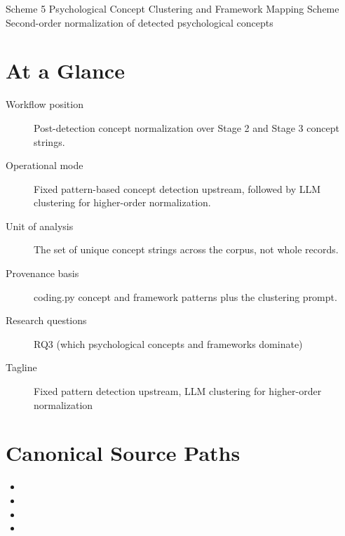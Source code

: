 \documentclass[11pt]{article}
\begin{document}
\schemeheader
  {Scheme 5}
  {Psychological Concept Clustering and Framework Mapping Scheme}
  {Second-order normalization of detected psychological concepts}


\section*{At a Glance}
\begin{description}
\item[Workflow position] Post-detection concept normalization over Stage 2 and Stage 3 concept strings.
\item[Operational mode] Fixed pattern-based concept detection upstream, followed by LLM clustering for higher-order normalization.
\item[Unit of analysis] The set of unique concept strings across the corpus, not whole records.
\item[Provenance basis] coding.py concept and framework patterns plus the clustering prompt.
\item[Research questions] RQ3 (which psychological concepts and frameworks dominate)
\item[Tagline] Fixed pattern detection upstream, LLM clustering for higher-order normalization
\end{description}

\section*{Canonical Source Paths}
\begin{itemize}
\item {}
\item {}
\item {}
\item {}
\end{itemize}
\end{document}
